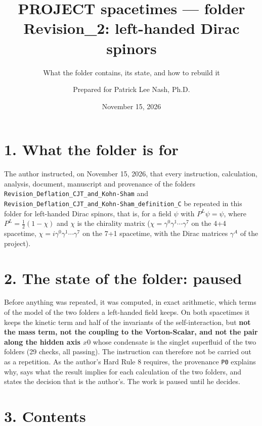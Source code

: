 \documentclass[
  10pt,
]{article}
\title{PROJECT spacetimes --- folder Revision\_2: left-handed Dirac
spinors}
\subtitle{What the folder contains, its state, and how to rebuild it}
\author{Prepared for Patrick Lee Nash, Ph.D.}
\date{November 15, 2026}
\begin{document}
\maketitle

\hypertarget{what-the-folder-is-for}{%
\section{1. What the folder is for}\label{what-the-folder-is-for}}

The author instructed, on November 15, 2026, that every instruction,
calculation, analysis, document, manuscript and provenance of the
folders \texttt{Revision\_Deflation\_CJT\_and\_Kohn-Sham} and
\texttt{Revision\_Deflation\_CJT\_and\_Kohn-Sham\_definition\_C} be
repeated in this folder for left-handed Dirac spinors, that is, for a
field \(\psi\) with \(P^L\psi=\psi\), where \(P^L=\tfrac12(1-\chi)\) and
\(\chi\) is the chirality matrix
(\(\chi=\gamma^{0}\gamma^{1}\cdots\gamma^{7}\) on the 4+4 spacetime,
\(\chi=i\gamma^{0}\gamma^{1}\cdots\gamma^{7}\) on the 7+1 spacetime,
with the Dirac matrices \(\gamma^A\) of the project).

\hypertarget{the-state-of-the-folder-paused}{%
\section{2. The state of the folder:
paused}\label{the-state-of-the-folder-paused}}

Before anything was repeated, it was computed, in exact arithmetic,
which terms of the model of the two folders a left-handed field keeps.
On both spacetimes it keeps the kinetic term and half of the invariants
of the self-interaction, but \textbf{not the mass term, not the coupling
to the Vorton-Scalar, and not the pair along the hidden axis \(x0\)}
whose condensate is the singlet superfluid of the two folders (29
checks, all passing). The instruction can therefore not be carried out
as a repetition. As the author's Hard Rule 8 requires, the provenance
\texttt{P0} explains why, says what the result implies for each
calculation of the two folders, and states the decision that is the
author's. The work is paused until he decides.

\hypertarget{contents}{%
\section{3. Contents}\label{contents}}
\end{document}
